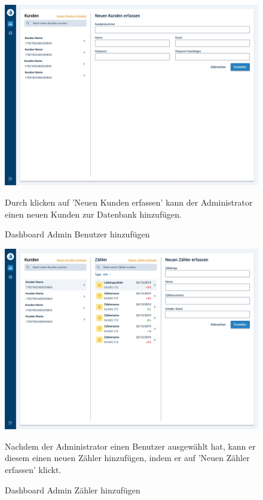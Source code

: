 \begin{figure}[h]
	\centering
    \includegraphics[scale=0.3]{img/WebsiteMockup/Dashboard-Admin-AddUser}
	\caption{Dashboard Admin Benutzer hinzufügen} \hfill \break
	Durch klicken auf 'Neuen Kunden erfassen' kann der Administrator einen neuen Kunden zur Datenbank hinzufügen.
\end{figure}

\newpage

\begin{figure}[h]
	\centering
    \includegraphics[scale=0.3]{img/WebsiteMockup/Dashboard-Admin-AddZahler}
	\caption{Dashboard Admin Zähler hinzufügen} \hfill \break
	Nachdem der Administrator einen Benutzer ausgewählt hat, kann er diesem einen neuen Zähler hinzufügen, indem er auf 'Neuen Zähler erfassen' klickt.
\end{figure}

